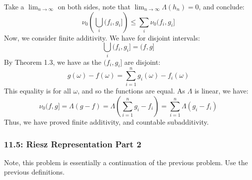 \documentclass[12pt,a4paper]{article}
\newcommand{\1}[1]{\mathbbm{1}\left\{ #1 \right\}}
\begin{document}
\begin{enumerate}
$$	$$
	Take a $\lim_{n \to \infty}$ on both sides, note that $\lim_{n \to \infty} \Lambda(h_n) = 0$, and conclude:
	$$
		\nu_0\left(\bigcup_i (f_i,g_i]\right) \leq \sum_i \nu_0(f_i,g_i]
	$$
	Now, we consider finite additivity. We have for disjoint intervals:
	$$
		\bigcup_i (f_i,g_i] = (f,g]
	$$
	By Theorem 1.3, we have as the $(f_i,g_i]$ are disjoint:
	$$
		g(\omega) - f(\omega) = \sum_{i=1}^n g_i(\omega) - f_i(\omega)
	$$
	This equality is for all $\omega$, and so the functions are equal. As $\Lambda$ is linear, we have:
	$$
		\nu_0(f,g] =
		\Lambda(g - f) = 
		\Lambda\left(\sum_{i=1}^n g_i - f_i\right) =
		\sum_{i=1}^n \Lambda(g_i - f_i)
	$$
	Thus, we have proved finite additivity, and countable subadditivity.
\end{enumerate}

\subsubsection{11.5: Riesz Representation Part 2} Note, this problem is essentially a continuation of the previous problem. Use the previous definitions.
\end{document}
